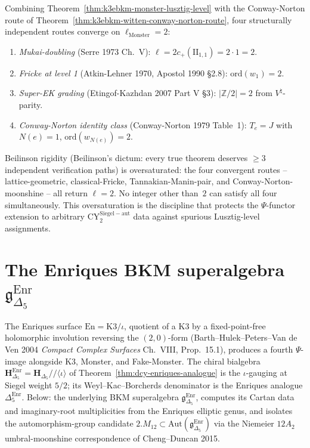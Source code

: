 \begin{remark}[Four independent routes converge on \texorpdfstring{$\ell_{\mathrm{Monster}} = 2$}{l-Monster = 2}]
\label{rem:k3ebkm-witten-four-routes}
Combining Theorem~\ref{thm:k3ebkm-monster-lusztig-level} with
the Conway-Norton route of
Theorem~\ref{thm:k3ebkm-witten-conway-norton-route}, four structurally
independent routes converge on $\ell_{\mathrm{Monster}} = 2$:
\begin{enumerate}[label=\textup{(\roman*)}]
\item \emph{Mukai-doubling} (Serre 1973 Ch.~V): $\ell = 2c_+(\mathrm{II}_{1,1})
 = 2\cdot 1 = 2$.
\item \emph{Fricke at level 1} (Atkin-Lehner 1970, Apostol 1990 \S2.8):
 $\mathrm{ord}(w_1) = 2$.
\item \emph{Super-EK grading} (Etingof-Kazhdan 2007 Part V \S3):
 $|\mathbb{Z}/2| = 2$ from $V^\natural$-parity.
\item \emph{Conway-Norton identity class} (Conway-Norton 1979
 Table~1): $T_e = J$ with $N(e) = 1$,
 $\mathrm{ord}(w_{N(e)}) = 2$.
\end{enumerate}
Beilinson rigidity (Beilinson's dictum: every true theorem deserves
$\ge 3$ independent verification paths) is oversaturated: the four
convergent routes -- lattice-geometric, classical-Fricke,
Tannakian-Manin-pair, and Conway-Norton-moonshine -- all return
$\ell = 2$. No integer other than~$2$ can satisfy all four
simultaneously. This oversaturation is the discipline that protects
the $\Psi$-functor extension to arbitrary $\mathrm{CY}^{\mathrm{Siegel-aut}}_2$
data against spurious Lusztig-level assignments.
\end{remark}

\section{The Enriques BKM superalgebra
\texorpdfstring{$\mathfrak{g}_{\Delta_5}^{\mathrm{Enr}}$}{g-Delta-5-Enr}}
\label{sec:bkm-enriques}

The Enriques surface $\mathrm{En} = \mathrm{K3}/\iota$, quotient of a
K3 by a fixed-point-free holomorphic involution reversing the
$(2,0)$-form
(Barth--Hulek--Peters--Van de Ven 2004 \emph{Compact Complex Surfaces}
Ch.~VIII, Prop.~15.1), produces a fourth $\Psi$-image alongside K3,
Monster, and Fake-Monster. The chiral bialgebra
$\mathbf{H}_{\Delta_5}^{\mathrm{Enr}} =
\mathbf{H}_{\Delta_5}/\!/\langle\iota\rangle$ of
Theorem~\ref{thm:dcy-enriques-analogue} is the
$\iota$-gauging at Siegel weight $5/2$; its Weyl--Kac--Borcherds
denominator is the Enriques analogue
$\Delta_5^{\mathrm{Enr}}$. Below:
the underlying BKM superalgebra
$\mathfrak{g}_{\Delta_5}^{\mathrm{Enr}}$, computes its Cartan data
and imaginary-root multiplicities from the Enriques elliptic
genus, and isolates the automorphism-group candidate
$2.M_{12}\subset\mathrm{Aut}(\mathfrak{g}_{\Delta_5}^{\mathrm{Enr}})$
via the Niemeier $12A_2$ umbral-moonshine correspondence of
Cheng--Duncan 2015.

